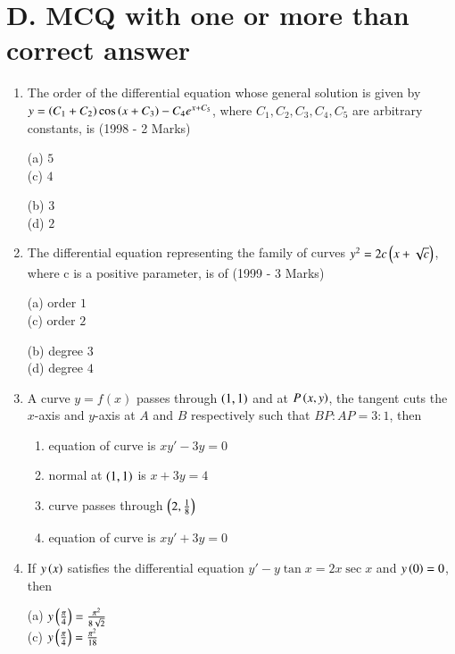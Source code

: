\documentclass[journal,12pt,twocolumn]{IEEEtran}
\theoremstyle{remark}
\begin{document}
\section*{D. MCQ with one or more than correct answer}
\begin{enumerate}
    
\item The order of the differential equation whose general solution is given by
$y = \left(C_1 + C_2\right) \cos \left(x + C_3\right) - C_4 e^{x+C_5}$, where $C_1, C_2, C_3, C_4, C_5$ are arbitrary constants, is \hfill (1998 - 2 Marks)

\begin{multicols}{2}
(a) $5$ \\ (c) $4$
\columnbreak

(b) $3$  \\(d) $2$ 
\end{multicols}

\item  The differential equation representing the family of curves
$y^2 = 2c \left(x + \sqrt{c}\right)$, where c  is a positive parameter, is of \hfill(1999 - 3 Marks)

\begin{multicols}{2}
(a) order $1$ \\ (c) order $2$
\columnbreak

(b) degree $3$  \\(d) degree $4$
\end{multicols}

\item  A curve $ y = f(x) $ passes through $ \left(1,1\right) $ and at $ P\left(x, y\right) $, the tangent cuts the $ x $-axis and $ y $-axis at $ A $ and $ B $ respectively such that $ BP : AP = 3 : 1 $, then
\begin{enumerate}[label=(\alph*)]
    \item equation of curve is $ xy' - 3y = 0 $
    \item normal at $ \left(1, 1\right) $ is $ x + 3y = 4 $
    \item curve passes through $ \left(2, \frac{1}{8}\right) $
    \item equation of curve is $xy' + 3y = 0 $
\end{enumerate}

\item  If $y\left(x\right)$ satisfies the differential equation $y' - y \tan x = 2x \sec x $ and $y\left(0\right) = 0 $, then

\begin{multicols}{2}
(a) $ y\left(\frac{\pi}{4}\right) = \frac{\pi^2}{8\sqrt{2}} $ \\ (c) $ y\left(\frac{\pi}{4}\right) = \frac{\pi^2}{18} $
\columnbreak


\end{multicols}
\end{enumerate}
\end{document}
